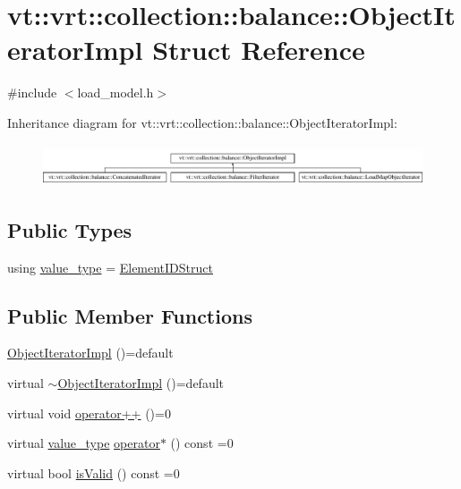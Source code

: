 \hypertarget{structvt_1_1vrt_1_1collection_1_1balance_1_1_object_iterator_impl}{}\section{vt\+:\+:vrt\+:\+:collection\+:\+:balance\+:\+:Object\+Iterator\+Impl Struct Reference}
\label{structvt_1_1vrt_1_1collection_1_1balance_1_1_object_iterator_impl}


{\ttfamily \#include $<$load\+\_\+model.\+h$>$}

Inheritance diagram for vt\+:\+:vrt\+:\+:collection\+:\+:balance\+:\+:Object\+Iterator\+Impl\+:\begin{figure}[H]
\begin{center}
\leavevmode
\includegraphics[height=1.252796cm]{structvt_1_1vrt_1_1collection_1_1balance_1_1_object_iterator_impl}
\end{center}
\end{figure}
\subsection*{Public Types}
\begin{DoxyCompactItemize}
\item 
using \hyperlink{structvt_1_1vrt_1_1collection_1_1balance_1_1_object_iterator_impl_a8a38ab2c722e341d729f61cb59112376}{value\+\_\+type} = \hyperlink{namespacevt_1_1vrt_1_1collection_1_1balance_a9f5b53fafb270212279a4757d2c4cd28}{Element\+I\+D\+Struct}
\end{DoxyCompactItemize}
\subsection*{Public Member Functions}
\begin{DoxyCompactItemize}
\item 
\hyperlink{structvt_1_1vrt_1_1collection_1_1balance_1_1_object_iterator_impl_a808e1d2a3427a4c9ed86ecafc28edd41}{Object\+Iterator\+Impl} ()=default
\item 
virtual \hyperlink{structvt_1_1vrt_1_1collection_1_1balance_1_1_object_iterator_impl_ab71847f88423abc159bf0d53ace9474b}{$\sim$\+Object\+Iterator\+Impl} ()=default
\item 
virtual void \hyperlink{structvt_1_1vrt_1_1collection_1_1balance_1_1_object_iterator_impl_ab59b65c6a22626b6d2d3ab283309ac1f}{operator++} ()=0
\item 
virtual \hyperlink{structvt_1_1vrt_1_1collection_1_1balance_1_1_object_iterator_impl_a8a38ab2c722e341d729f61cb59112376}{value\+\_\+type} \hyperlink{structvt_1_1vrt_1_1collection_1_1balance_1_1_object_iterator_impl_a361451a08b7d2361ee9f0e5b3c35c089}{operator$\ast$} () const =0
\item 
virtual bool \hyperlink{structvt_1_1vrt_1_1collection_1_1balance_1_1_object_iterator_impl_a16b8504d1abff325f65ce29513792386}{is\+Valid} () const =0
\end{DoxyCompactItemize}


